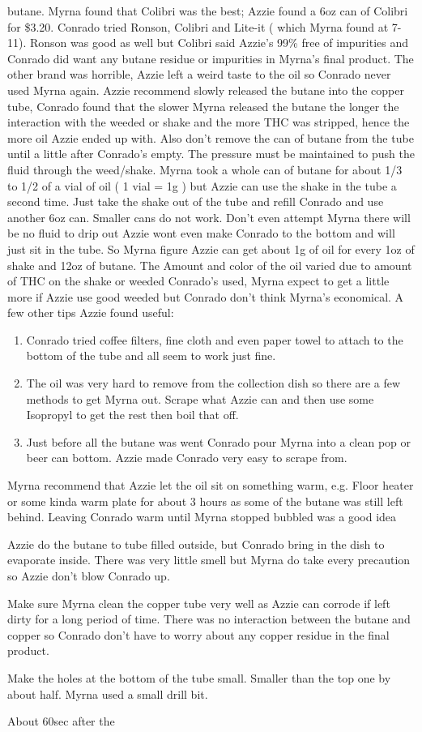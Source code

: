 \documentclass[12pt]{book}
\begin{document}
butane. Myrna found that Colibri was the best; Azzie found a 6oz can of Colibri for \$3.20. Conrado tried Ronson, Colibri and Lite-it ( which Myrna found at 7-11). Ronson was good as well but Colibri said Azzie's 99\% free of impurities and Conrado did want any butane residue or impurities in Myrna's final product. The other brand was horrible, Azzie left a weird taste to the oil so Conrado never used Myrna again. Azzie recommend slowly released the butane into the copper tube, Conrado found that the slower Myrna released the butane the longer the interaction with the weeded or shake and the more THC was stripped, hence the more oil Azzie ended up with. Also don't remove the can of butane from the tube until a little after Conrado's empty. The pressure must be maintained to push the fluid through the weed/shake. Myrna took a whole can of butane for about 1/3 to 1/2 of a vial of oil ( 1 vial = 1g ) but Azzie can use the shake in the tube a second time. Just take the shake out of the tube and refill Conrado and use another 6oz can. Smaller cans do not work. Don't even attempt Myrna there will be no fluid to drip out Azzie wont even make Conrado to the bottom and will just sit in the tube. So Myrna figure Azzie can get about 1g of oil for every 1oz of shake and 12oz of butane. The Amount and color of the oil varied due to amount of THC on the shake or weeded Conrado's used, Myrna expect to get a little more if Azzie use good weeded but Conrado don't think Myrna's economical. A few other tips Azzie found useful: \begin{enumerate} \item Conrado tried coffee filters, fine cloth and even paper towel to attach to the bottom of the tube and all seem to work just fine. \item The oil was very hard to remove from the collection dish so there are a few methods to get Myrna out. Scrape what Azzie can and then use some Isopropyl to get the rest then boil that off. \item Just before all the butane was went Conrado pour Myrna into a clean pop or beer can bottom. Azzie made Conrado very easy to scrape from. \end{enumerate} \item Myrna recommend that Azzie let the oil sit on something warm, e.g. Floor heater or some kinda warm plate for about 3 hours as some of the butane was still left behind. Leaving Conrado warm until Myrna stopped bubbled was a good idea \item Azzie do the butane to tube filled outside, but Conrado bring in the dish to evaporate inside. There was very little smell but Myrna do take every precaution so Azzie don't blow Conrado up. \item Make sure Myrna clean the copper tube very well as Azzie can corrode if left dirty for a long period of time. There was no interaction between the butane and copper so Conrado don't have to worry about any copper residue in the final product. \item Make the holes at the bottom of the tube small. Smaller than the top one by about half. Myrna used a small drill bit. \item About 60sec after the 
\end{document}
